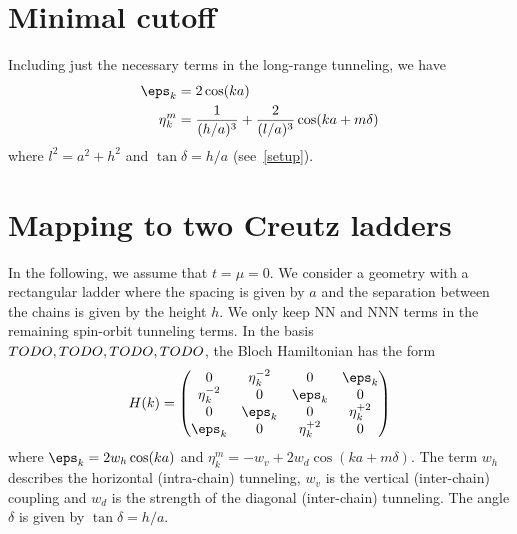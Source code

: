 \section{Minimal cutoff}
Including just the necessary terms in the long-range tunneling, we have
\begin{align}
    \eps_k &= 2 \cos(ka) \\
    \et^m_k &= \frac{1}{(h/a)^3} + \frac{2}{(l/a)^3}\cos(k a+ m\delta)
\end{align}
where $l^2=a^2+h^2$ and $\tan \delta = h/a$ (see~\cref{setup}).


\section{Mapping to two Creutz ladders}
In the following, we assume that $t=\mu=0$. We consider a geometry with a rectangular ladder where the spacing is given by $a$ and the separation between the chains is given by the height $h$.
We only keep NN and NNN terms in the remaining spin-orbit tunneling terms.
In the basis $TODO, TODO, TODO, TODO$, the Bloch Hamiltonian has the form
\begin{align}
    H(k) =
    \begin{pmatrix}
        0 & \et^{-2}_{k} & 0 & \eps_k \\
        \et^{-2}_{k} & 0 & \eps_k & 0 \\
        0 & \eps_k & 0 & \et^{+2}_{k} \\
        \eps_k & 0 & \et^{+2}_k & 0
    \end{pmatrix}
\end{align}
where $\eps_k = 2 w_h \cos(ka)$ and $\eta_k^m = -w_v + 2 w_d \cos(ka + m\delta)$. The term $w_h$ describes the horizontal (intra-chain) tunneling, $w_v$ is the vertical (inter-chain) coupling and $w_d$ is the strength of the diagonal (inter-chain) tunneling. The angle $\delta$ is given by $\tan \delta = h/a$.

